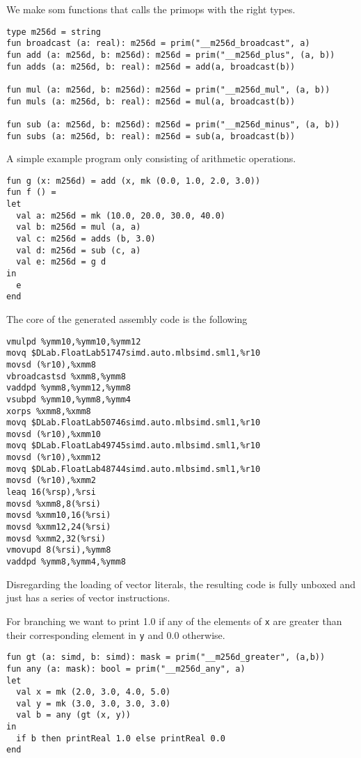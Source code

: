 \documentclass{article}
\begin{document}
We make som functions that calls the primops with the right types.
\begin{lstlisting}
type m256d = string
fun broadcast (a: real): m256d = prim("__m256d_broadcast", a)
fun add (a: m256d, b: m256d): m256d = prim("__m256d_plus", (a, b))
fun adds (a: m256d, b: real): m256d = add(a, broadcast(b))

fun mul (a: m256d, b: m256d): m256d = prim("__m256d_mul", (a, b))
fun muls (a: m256d, b: real): m256d = mul(a, broadcast(b))

fun sub (a: m256d, b: m256d): m256d = prim("__m256d_minus", (a, b))
fun subs (a: m256d, b: real): m256d = sub(a, broadcast(b))
\end{lstlisting}
A simple example program only consisting of arithmetic operations.
\begin{lstlisting}
fun g (x: m256d) = add (x, mk (0.0, 1.0, 2.0, 3.0))
fun f () =
let
  val a: m256d = mk (10.0, 20.0, 30.0, 40.0)
  val b: m256d = mul (a, a)
  val c: m256d = adds (b, 3.0)
  val d: m256d = sub (c, a)
  val e: m256d = g d
in 
  e
end
\end{lstlisting}
The core of the generated assembly code is the following
\begin{verbatim}
vmulpd %ymm10,%ymm10,%ymm12
movq $DLab.FloatLab51747simd.auto.mlbsimd.sml1,%r10
movsd (%r10),%xmm8
vbroadcastsd %xmm8,%ymm8
vaddpd %ymm8,%ymm12,%ymm8
vsubpd %ymm10,%ymm8,%ymm4
xorps %xmm8,%xmm8
movq $DLab.FloatLab50746simd.auto.mlbsimd.sml1,%r10
movsd (%r10),%xmm10
movq $DLab.FloatLab49745simd.auto.mlbsimd.sml1,%r10
movsd (%r10),%xmm12
movq $DLab.FloatLab48744simd.auto.mlbsimd.sml1,%r10
movsd (%r10),%xmm2
leaq 16(%rsp),%rsi
movsd %xmm8,8(%rsi)
movsd %xmm10,16(%rsi)
movsd %xmm12,24(%rsi)
movsd %xmm2,32(%rsi)
vmovupd 8(%rsi),%ymm8
vaddpd %ymm8,%ymm4,%ymm8
\end{verbatim}
Disregarding the loading of vector literals, the resulting code is fully unboxed and just has a series of vector instructions.

For branching we want to print 1.0 if any of the elements of \verb!x! are greater than their corresponding element in \verb!y! and 0.0 otherwise.

\begin{lstlisting}
fun gt (a: simd, b: simd): mask = prim("__m256d_greater", (a,b))
fun any (a: mask): bool = prim("__m256d_any", a)
let
  val x = mk (2.0, 3.0, 4.0, 5.0)
  val y = mk (3.0, 3.0, 3.0, 3.0)
  val b = any (gt (x, y))
in 
  if b then printReal 1.0 else printReal 0.0
end
\end{lstlisting}
\end{document}
